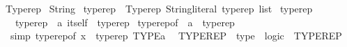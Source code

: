 %
\begin{isabellebody}%
%
%
\isadelimdocument
%
\endisadelimdocument
%
\isatagdocument
%
\isamarkuptrue%
%
\endisatagdocument
{\isafolddocument}%
%
\isadelimdocument
%
\endisadelimdocument
%
\isadelimtheory
%
\endisadelimtheory
%
\isatagtheory
{}\isamarkupfalse%
\ Typerep\isanewline
{}\ String\isanewline
{}%
\endisatagtheory
{\isafoldtheory}%
%
\isadelimtheory
\isanewline
%
\endisadelimtheory
\isanewline
{}\isamarkupfalse%
\ typerep\ {\isacharequal}{\kern0pt}\ Typerep\ String{\isachardot}{\kern0pt}literal\ {\isachardoublequoteopen}typerep\ list{\isachardoublequoteclose}\isanewline
\isanewline
{}\isamarkupfalse%
\ typerep\ {\isacharequal}{\kern0pt}\isanewline
\ \ \ typerep\ {\isacharcolon}{\kern0pt}{\isacharcolon}{\kern0pt}\ {\isachardoublequoteopen}{\isacharprime}{\kern0pt}a\ itself\ {\isasymRightarrow}\ typerep{\isachardoublequoteclose}\isanewline
{}\isanewline
\isanewline
{}\isamarkupfalse%
\ typerep{\isacharunderscore}{\kern0pt}of\ {\isacharcolon}{\kern0pt}{\isacharcolon}{\kern0pt}\ {\isachardoublequoteopen}{\isacharprime}{\kern0pt}a\ {\isasymRightarrow}\ typerep{\isachardoublequoteclose}\ \isanewline
\ \ {\isacharbrackleft}{\kern0pt}simp{\isacharbrackright}{\kern0pt}{\isacharcolon}{\kern0pt}\ {\isachardoublequoteopen}typerep{\isacharunderscore}{\kern0pt}of\ x\ {\isacharequal}{\kern0pt}\ typerep\ TYPE{\isacharparenleft}{\kern0pt}{\isacharprime}{\kern0pt}a{\isacharparenright}{\kern0pt}{\isachardoublequoteclose}\isanewline
\isanewline
{}\isamarkupfalse%
\isanewline
\isanewline
{}\isamarkupfalse%
\isanewline
\ \ {\isachardoublequoteopen}{\isacharunderscore}{\kern0pt}TYPEREP{\isachardoublequoteclose}\ {\isacharcolon}{\kern0pt}{\isacharcolon}{\kern0pt}\ {\isachardoublequoteopen}type\ {\isacharequal}{\kern0pt}{\isachargreater}{\kern0pt}\ logic{\isachardoublequoteclose}\ \ {\isacharparenleft}{\kern0pt}{\isachardoublequoteopen}{\isacharparenleft}{\kern0pt}{}TYPEREP{\isacharslash}{\kern0pt}{\isacharparenleft}{\kern0pt}{}{\isacharprime}{\kern0pt}{\isacharparenleft}{\kern0pt}{\isacharunderscore}{\kern0pt}{\isacharprime}{\kern0pt}{\isacharparenright}{\kern0pt}{\isacharparenright}{\kern0pt}{\isacharparenright}{\kern0pt}{\isachardoublequoteclose}{\isacharparenright}{\kern0pt}\isanewline
%
\isadelimML
\isanewline
%
\endisadelimML
%
\isatagML

\end{isabellebody}
